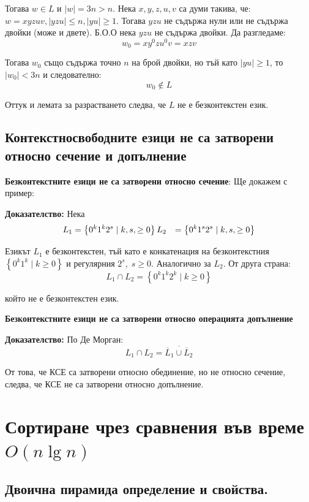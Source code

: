 \documentclass{article}
\renewcommand{\\}{\newline}
\newcommand{\sep}{\;|\;}
\newcommand{\doc}{\textbf{Доказателство: }}
\begin{document}
     Тогава \(w \in L\) и \(\left|w\right| = 3n > n\). Нека \(x, y, z, u, v\) са думи такива, че: \(w = xyzuv, \left|yzu\right| \leq n, \left|yu\right| \geq 1\). Тогава \(yzu\) не съдържа нули или не съдържа двойки (може и двете). Б.О.О нека \(yzu\) не съдържа двойки. Да разгледаме: \[
       w_{0} = xy^{0}zu^{0}v = xzv
     \]        

     Тогава \(w_{0}\) също съдържа точно \(n\) на брой двойки, но тъй като \(\left|yu\right|\geq 1\), то \(\left|w_{0}\right| < 3n\) и следователно: \[
       w_{0} \not\in L
     \] 

     Оттук и лемата за разрастването следва, че \(L\) не е безконтекстен език. 
     
     \subsection{Контекстносвободните езици не са затворени относно сечение и допълнение }
      \textbf{Безконтекстните езици не са затворени относно сечение}: Ще докажем с пример:

      \doc Нека \begin{align*}
        L_{1} &= \left\{0^{k}1^{k}2^{s} \sep k, s, \geq 0\right\} \\
        L_{2} &= \left\{0^{k}1^{s}2^{s} \sep k, s, \geq 0\right\} 
      \end{align*}

      Езикът \(L_{1}\) е безконтекстен, тъй като е конкатенация на безконтекстния \(\left\{0^{k}1^{k} \sep k \geq 0\right\}\) и регулярния \(2^{s},\; s\geq 0\). Аналогично за \(L_{2}\). От друга страна: \[
        L_{1} \cap L_{2} = \left\{0^{k}1^{k}2^{k} \sep k \geq 0\right\}
      \] 

      който не е безконтекстен език.

      \textbf{Безконтекстните езици не са затворени относно операцията допълнение}

      \doc По Де Морган: \[
        L_{1} \cap L_{2} = \overline{\overline{L}_1 \cup \overline{L}_2}
      \] 

      От това, че КСЕ са затворени относно обединение, но не относно сечение, следва, че КСЕ не са затворени относно допълнение. 

\newpage
\section{Сортиране чрез сравнения във време \(O(n\lg n)\)}
\subsection{Двоична пирамида определение и свойства. }
\end{document}
